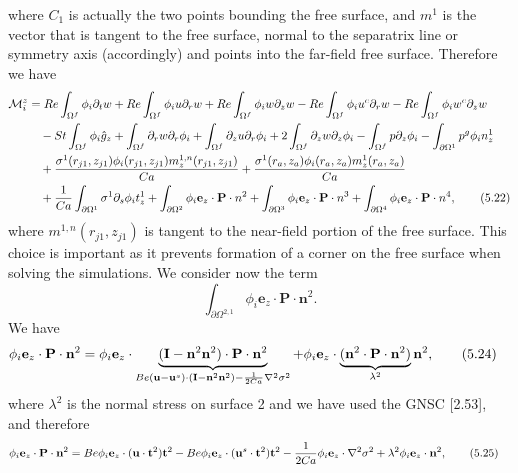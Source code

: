 \documentclass{article}
\begin{document}
where $C_1$ is actually the two points bounding the free surface, and $m^1$ is the vector that is tangent to the free surface, normal to the separatrix line or symmetry axis (accordingly) and points into the far-field free surface. Therefore we have
\begin{align}
\mathcal{M}_i^z &= Re \int_{\Omega^f} \phi_i \partial_t w + Re \int_{\Omega^f} \phi_i u \partial_r w + Re \int_{\Omega^f} \phi_i w \partial_z w - Re \int_{\Omega^f} \phi_i u^c \partial_r w - Re \int_{\Omega^f} \phi_i w^c \partial_z w \nonumber\\
&\quad - St \int_{\Omega^f} \phi_i \hat{g}_z + \int_{\Omega^f} \partial_r w \partial_r \phi_i + \int_{\Omega^f} \partial_z u \partial_r \phi_i + 2 \int_{\Omega^f} \partial_z w \partial_z \phi_i - \int_{\Omega^f} p \partial_z \phi_i - \int_{\partial \Omega^1} p^g \phi_i n_z^1 \nonumber\\
&\quad + \frac{\sigma^1(r_{j1},z_{j1}) \phi_i(r_{j1},z_{j1}) m_z^{1,n}(r_{j1},z_{j1})}{Ca} + \frac{\sigma^1(r_a,z_a) \phi_i(r_a,z_a) m_z^{1}(r_a,z_a)}{Ca} \nonumber\\
&\quad + \frac{1}{Ca} \int_{\partial \Omega^1} \sigma^1 \partial_s \phi_i t_z^1 + \int_{\partial \Omega^2} \phi_i \mathbf{e}_z \cdot \mathbf{P} \cdot n^2 + \int_{\partial \Omega^3} \phi_i \mathbf{e}_z \cdot \mathbf{P} \cdot n^3 + \int_{\partial \Omega^4} \phi_i \mathbf{e}_z \cdot \mathbf{P} \cdot n^4, \tag{5.22}
\end{align}
where $m^{1,n}(r_{j1},z_{j1})$ is tangent to the near-field portion of the free surface. This choice is important as it prevents formation of a corner on the free surface when solving the simulations.
We consider now the term
\begin{equation}
\int_{\partial \Omega^{2,1}} \phi_i \mathbf{e}_z \cdot \mathbf{P} \cdot \mathbf{n}^2. \tag{5.23}
\end{equation}
We have
\begin{align}
\phi_i \mathbf{e}_z \cdot \mathbf{P} \cdot \mathbf{n}^2 &= \phi_i \mathbf{e}_z \cdot \underbrace{(\mathbf{I} - \mathbf{n}^2 \mathbf{n}^2) \cdot \mathbf{P} \cdot \mathbf{n}^2}_{Be (\mathbf{u} - \mathbf{u}^s) \cdot (\mathbf{I} - \mathbf{n}^2 \mathbf{n}^2) - \frac{1}{2Ca} \nabla^2 \sigma^2} + \phi_i \mathbf{e}_z \cdot \underbrace{(\mathbf{n}^2 \cdot \mathbf{P} \cdot \mathbf{n}^2)}_{\lambda^2} \mathbf{n}^2, \tag{5.24}
\end{align}
where $\lambda^2$ is the normal stress on surface 2 and we have used the GNSC [2.53], and therefore
\begin{align}
\phi_i \mathbf{e}_z \cdot \mathbf{P} \cdot \mathbf{n}^2 &= Be \phi_i \mathbf{e}_z \cdot (\mathbf{u} \cdot \mathbf{t}^2) \mathbf{t}^2 - Be \phi_i \mathbf{e}_z \cdot (\mathbf{u}^s \cdot \mathbf{t}^2) \mathbf{t}^2 - \frac{1}{2Ca} \phi_i \mathbf{e}_z \cdot \nabla^2 \sigma^2 + \lambda^2 \phi_i \mathbf{e}_z \cdot \mathbf{n}^2, \tag{5.25}
\end{align}
\end{document}
